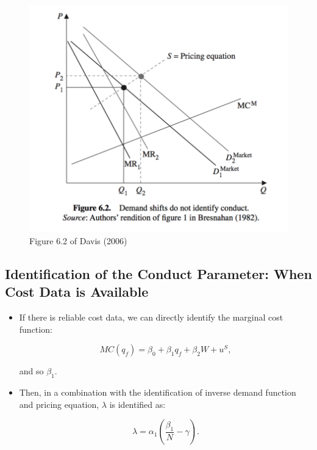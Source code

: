 \documentclass[]{book}
\providecommand{\tightlist}{%
  \setlength{\itemsep}{0pt}\setlength{\parskip}{0pt}}
\begin{document}
\begin{figure}

{\centering \includegraphics[width=0.8\linewidth]{figuretable/demandshift} 

}

\caption{Figure 6.2 of Davis (2006)}\label{fig:unnamed-chunk-25}
\end{figure}

\subsection{Identification of the Conduct Parameter: When Cost Data is
Available}\label{identification-of-the-conduct-parameter-when-cost-data-is-available}

\begin{itemize}
\tightlist
\item
  If there is reliable cost data, we can directly identify the marginal
  cost function:

  \begin{equation}
  MC(q_f) = \beta_0 + \beta_1 q_f + \beta_2 W + u^S,
  \end{equation}

  and so \(\beta_1\).
\item
  Then, in a combination with the identification of inverse demand
  function and pricing equation, \(\lambda\) is identified as:

  \begin{equation}
  \lambda = \alpha_1 \left(\frac{\beta_1}{N} - \gamma\right).
  \end{equation}
\end{itemize}
\end{document}
